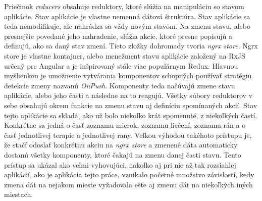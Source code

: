 Priečinok \textit{reducers} obsahuje reduktory, ktoré slúžia na manipuláciu so stavom aplikácie. Stav aplikácie je vlastne nemenná dátová štruktúra. Stav aplikácie sa teda nemodifikuje, ale nahrádza sa vždy novým stavom. Na zmenu stavu, alebo presnejšie povedané jeho nahradenie, slúžia akcie, ktoré presne popisujú a definujú, ako sa daný stav zmení. Tieto zložky dohromady tvoria \textit{ngrx store}. Ngrx store je vlastne kontajner, alebo menežment stavu aplikácie založený na RxJS určený pre Angular a je inšpirovaný stále viac populárnym Redux. Hlavnou myšlienkou je umožnenie vytvárania komponentov schopných používať stratégiu detekcie zmeny nazvanú \textit{OnPush}. Komponenty teda načúvajú zmene stavu aplikácie, alebo jeho časti a následne na to reagujú. Všetky súbory reduktorov v sebe obsahujú okrem funkcie na zmenu stavu aj definíciu spomínaných akcií. Stav tejto aplikácie sa skladá, ako už bolo niekoľko krát spomenuté, z niekoľkých častí. Konkrétne sa jedná o časť zoznamu mierok, zoznamu liečení, zoznamu rán a o časť jednotlivej terapie a jednotlivej rany. Veľkou výhodou takéhoto prístupu je, že stačí odoslať konkrétnu akciu na \textit{ngrx store} a zmenené dáta automaticky dostanú všetky komponenty, ktoré čakajú na zmenu danej časti stavu. Tento prístup sa ukázal ako veľmi vyhovujúci, nakoľko aj pri nie až tak rozsiahlej aplikácií, ako je aplikácia tejto práce, vznikalo početné množstvo závislostí, kedy zmena dát na nejakom mieste  vyžadovala ešte aj zmenu dát na niekoľkých iných miestach.

